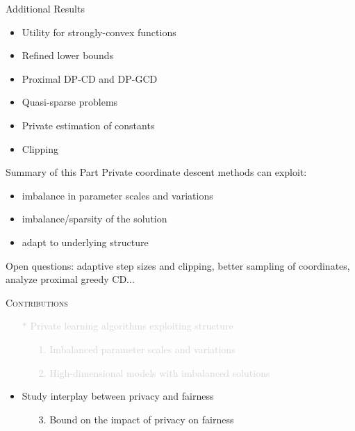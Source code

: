 \documentclass[17pt,aspectratio=169]{beamer}
\begin{document}
\begin{frame}{Additional Results}
  \begin{itemize}
  \item Utility for strongly-convex functions
  \item Refined lower bounds
  \item Proximal DP-CD and DP-GCD
  \item Quasi-sparse problems
  \item Private estimation of constants
  \item Clipping
  \end{itemize}
\end{frame}

\begin{frame}{Summary of this Part}
  Private coordinate descent methods can exploit:
  \begin{itemize}
  \item imbalance in parameter scales and variations
  \item imbalance/sparsity of the solution
  \item adapt to underlying structure
  \end{itemize}

  \vspace{1em}

  \pause

  Open questions: adaptive step sizes and clipping, better sampling of
  coordinates, analyze proximal greedy CD...
\end{frame}

\begin{frame}{\textsc{Contributions}}

  \begin{itemize}
    \large
  \item[\textcolor{lightgray}{$\ast$}] \textcolor{lightgray}{Private learning algorithms exploiting structure}
    \begin{enumerate}
      \normalsize
    \item[\textcolor{lightgray}{1.}] \textcolor{lightgray}{Imbalanced parameter scales and variations}
    \item[\textcolor{lightgray}{2.}] \textcolor{lightgray}{High-dimensional models with imbalanced solutions}
    \end{enumerate}
    \vspace{1em}
  \item Study interplay between privacy and fairness
    \large
    \begin{enumerate}
      \normalsize
    \item[3.] Bound on the impact of privacy on fairness
    \end{enumerate}
  \end{itemize}
\end{frame}
\end{document}
